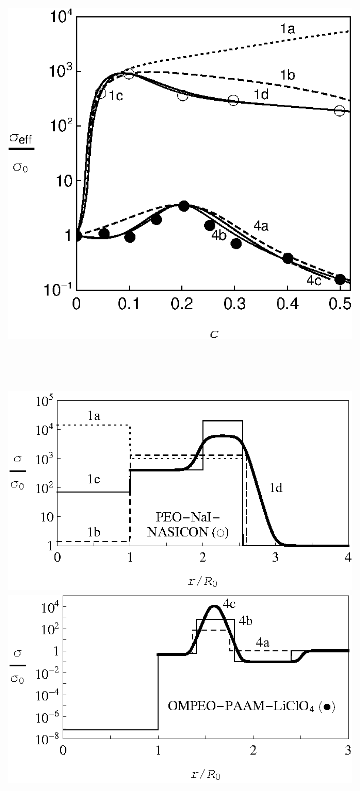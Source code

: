 \documentclass[twoside,a4paper,14pt]{vakaref-utf8}
\begin{document}
\begin{figure}[bt]
	\centering
	\begin{subfigure}[c]{0.45\textwidth}
		\includegraphics[width=\textwidth]{Fig3_PEO-NASICON_NaI_OMPEO-PAAM_LiClO4.eps}
		\caption{} \label{fig:OMPEO-LiClO4-a}
	\end{subfigure}%
	~
	\begin{subfigure}[c]{0.38\textwidth}
		\includegraphics[width=\textwidth]{Fig2_PEO-NaI_NASICON_Profile.eps}
		\includegraphics[width=\textwidth]{Fig3_OMPEO-PAAM_LiClO4_Profile.eps}

\end{subfigure}
\end{figure}
\end{document}
